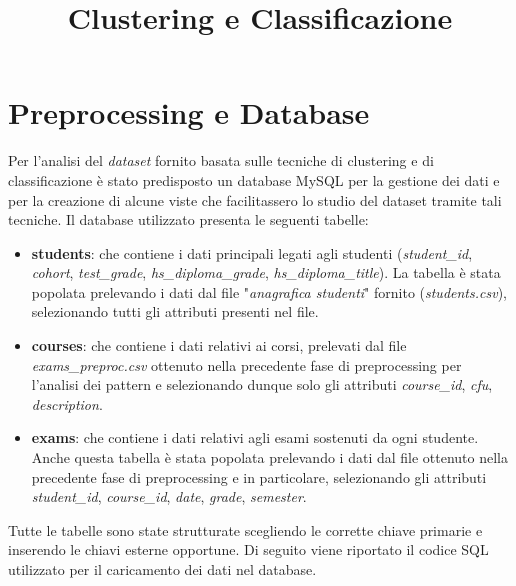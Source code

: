 \documentclass[]{article}
\title{Clustering e Classificazione}
\author{}
\begin{document}
\maketitle

\begin{abstract}

\end{abstract}

\section{Preprocessing e Database}
Per l'analisi del \textit{dataset} fornito basata sulle tecniche di clustering e di classificazione \`{e} stato predisposto un database MySQL per la gestione dei dati e per la creazione di alcune viste che facilitassero lo studio del dataset tramite tali tecniche. Il database utilizzato presenta le seguenti tabelle:
\begin{itemize}
	\item \textbf{students}: che contiene i dati principali legati agli studenti (\textit{student\_id}, \textit{cohort}, \textit{test\_grade}, \textit{hs\_diploma\_grade}, \textit{hs\_diploma\_title}). La tabella \`{e} stata popolata prelevando i dati dal file "\textit{anagrafica studenti}" fornito (\textit{students.csv}), selezionando tutti gli attributi presenti nel file.
	
	\item \textbf{courses}: che contiene i dati relativi ai corsi, prelevati dal file \textit{exams\_preproc.csv} ottenuto nella precedente fase di preprocessing per l'analisi dei pattern e selezionando dunque solo gli attributi \textit{course\_id}, \textit{cfu}, \textit{description}.
	 
	\item \textbf{exams}: che contiene i dati relativi agli esami sostenuti da ogni studente. Anche questa tabella \`{e} stata popolata prelevando i dati dal file ottenuto nella precedente fase di preprocessing e in particolare, selezionando gli attributi \textit{student\_id}, \textit{course\_id}, \textit{date}, \textit{grade}, \textit{semester}.
\end{itemize}

Tutte le tabelle sono state strutturate scegliendo le corrette chiave primarie e inserendo le chiavi esterne opportune. Di seguito viene riportato il codice SQL utilizzato per il caricamento dei dati nel database.


\end{document}
